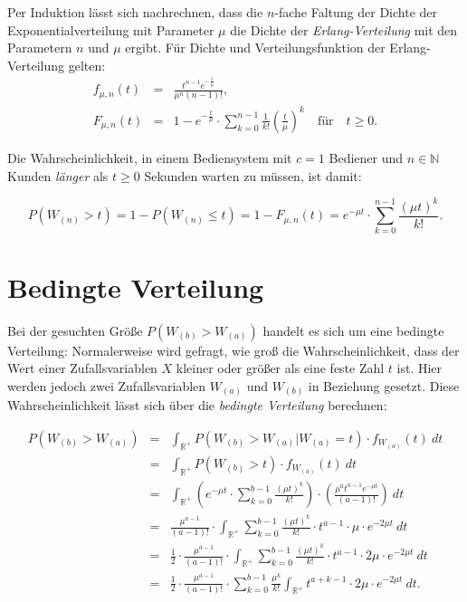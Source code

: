 \documentclass[a4paper,11pt,oneside]{article}
\begin{document}
Per Induktion lässt sich nachrechnen, dass die $n$-fache Faltung der Dichte der Exponentialverteilung mit Parameter $\mu$ die Dichte der \emph{Erlang-Verteilung} mit den Parametern $n$ und $\mu$ ergibt. Für Dichte und Verteilungsfunktion der Erlang-Verteilung gelten:
\begin{eqnarray*}
f_{\mu,n}(t)&=&\frac{t^{n-1}e^{-\frac{t}{\mu}}}{\mu^n(n-1)!},\\
F_{\mu,n}(t)&=&1-e^{-\frac{t}{\mu}}\cdot\sum_{k=0}^{n-1}\frac{1}{k!}\left(\frac{t}{\mu}\right)^k \quad\text{für}\quad t\geq0.
\end{eqnarray*}

Die Wahrscheinlichkeit, in einem Bediensystem mit $c=1$ Bediener und $n\in\mathbb{N}$ Kunden \emph{länger} als $t\ge0$ Sekunden warten zu müssen, ist damit:

$$
P(W_{(n)}>t)=
1-P(W_{(n)}\le t)=
1-F_{\mu,n}(t)=
e^{-\mu t}\cdot\sum_{k=0}^{n-1}\frac{(\mu t)^k}{k!}.
$$



\section{Bedingte Verteilung}

Bei der gesuchten Größe $P(W_{(b)}>W_{(a)})$ handelt es sich um eine bedingte Verteilung: Normalerweise wird gefragt, wie groß die Wahrscheinlichkeit, dass der Wert einer Zufallsvariablen $X$ kleiner oder größer als eine feste Zahl $t$ ist. Hier werden jedoch zwei Zufallsvariablen $W_{(a)}$ und $W_{(b)}$ in Beziehung gesetzt. Diese Wahrscheinlichkeit lässt sich über die \emph{bedingte Verteilung} berechnen:

\begin{eqnarray*}
P(W_{(b)}>W_{(a)})&=&
\int_{\mathbb{R}^+}P(W_{(b)}>W_{(a)}|W_{(a)}=t)\cdot f_{W_{(a)}}(t)~dt\\
~&=&
\int_{\mathbb{R}^+}P(W_{(b)}>t)\cdot f_{W_{(a)}}(t)~dt\\
~&=&
\int_{\mathbb{R}^+}
\left(e^{-\mu t}\cdot\sum_{k=0}^{b-1}\frac{(\mu t)^k}{k!}\right)\cdot\left(\frac{\mu^at^{a-1}e^{-\mu t}}{(a-1)!}\right)~dt\\
~&=&
\frac{\mu^{a-1}}{(a-1)!}\cdot\int_{\mathbb{R}^+}\sum_{k=0}^{b-1}\frac{(\mu t)^k}{k!}\cdot t^{a-1}\cdot\mu\cdot e^{-2\mu t}~dt\\
~&=&
\frac{1}{2}\cdot\frac{\mu^{a-1}}{(a-1)!}\cdot\int_{\mathbb{R}^+}\sum_{k=0}^{b-1}\frac{(\mu t)^k}{k!}\cdot t^{a-1}\cdot2\mu\cdot e^{-2\mu t}~dt\\
~&=&
\frac{1}{2}\cdot\frac{\mu^{a-1}}{(a-1)!}\cdot\sum_{k=0}^{b-1} \frac{\mu^k}{k!}\int_{\mathbb{R}^+}t^{a+k-1}\cdot2\mu\cdot e^{-2\mu t}~dt.
\end{eqnarray*}
\end{document}
